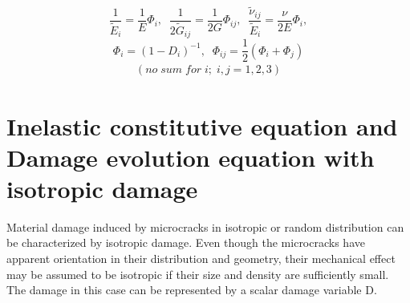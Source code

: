 \documentclass[a4paper,12pt]{article}
\begin{document}
\begin{equation}
\frac{1}{\tilde{E}_{i}} = \frac{1}{E}\Phi_{i}, \;\; \frac{1}{2\tilde{G}_{ij}}  = \frac{1}{2G}\Phi_{ij},\;\; \frac{\tilde{\nu}_{ij}}{\tilde{E}_{i}} =  \frac{\nu}{2E}\Phi_{i},
\end{equation} 
\begin{equation}
\Phi_{i}  =   (1  - D_{i})^{-1}, \;\; \Phi_{ij} =  \frac{1}{2}(\Phi_{i}  +  \Phi_{j}) 
\end{equation}
\begin{align*}
(no \; sum \; for \; i; \; i,j = 1,2,3)
\end{align*}
\section{Inelastic constitutive equation and Damage evolution equation with isotropic damage}
\indent\indent\indent  Material damage induced by microcracks in isotropic or random distribution can be characterized by isotropic damage. Even though the microcracks have apparent orientation in their distribution and geometry, their mechanical effect may be assumed to be isotropic if their size and density are sufficiently small. The damage in this case can be represented by a scalar damage variable D.
\end{document}
